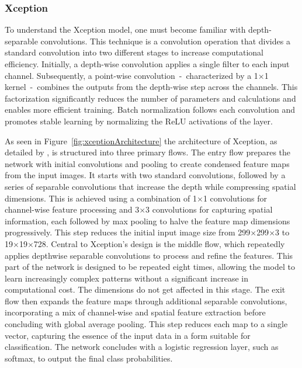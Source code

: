 \subsubsection{Xception}\label{xception}

To understand the Xception model, one must become familiar with depth-separable convolutions. This technique is a convolution operation that divides a standard convolution into two different stages to increase computational efficiency. Initially, a depth-wise convolution applies a single filter to each input channel. Subsequently, a point-wise convolution~-~characterized by a 1$\times$1 kernel~-~combines the outputs from the depth-wise step across the channels. This factorization significantly reduces the number of parameters and calculations and enables more efficient training. Batch normalization follows each convolution and promotes stable learning by normalizing the ReLU activations of the layer.

As seen in Figure~\ref{fig:xceptionArchitecture} the architecture of Xception, as detailed by \citep{chollet2017xception}, is structured into three primary flows. The entry flow prepares the network with initial convolutions and pooling to create condensed feature maps from the input images. It starts with two standard convolutions, followed by a series of separable convolutions that increase the depth while compressing spatial dimensions. This is achieved using a combination of 1$\times$1 convolutions for channel-wise feature processing and 3$\times$3 convolutions for capturing spatial information, each followed by max pooling to halve the feature map dimensions progressively. This step reduces the initial input image size from 299$\times$299$\times$3 to 19$\times$19$\times$728. Central to Xception's design is the middle flow, which repeatedly applies depthwise separable convolutions to process and refine the features. This part of the network is designed to be repeated eight times, allowing the model to learn increasingly complex patterns without a significant increase in computational cost. The dimensions do not get affected in this stage. The exit flow then expands the feature maps through additional separable convolutions, incorporating a mix of channel-wise and spatial feature extraction before concluding with global average pooling. This step reduces each map to a single vector, capturing the essence of the input data in a form suitable for classification. The network concludes with a logistic regression layer, such as softmax, to output the final class probabilities.

